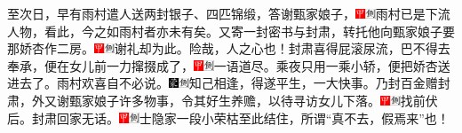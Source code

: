 {至次日，早有雨村遣人送两封银子、四匹锦缎，答谢甄家娘子，{\includegraphics[width=3mm]{../Images/00002}\includegraphics[width=3mm]{../Images/00011}\footnotesize \kaishu 雨村已是下流人物，看此，今之如雨村者亦未有矣。}又寄一封密书与封肃，转托他向甄家娘子要那娇杏作二房。{\includegraphics[width=3mm]{../Images/00002}\includegraphics[width=3mm]{../Images/00011}\footnotesize \kaishu 谢礼却为此。险哉，人之心也！}封肃喜得屁滚尿流，巴不得去奉承，便在女儿前一力撺掇成了，{\includegraphics[width=3mm]{../Images/00002}\includegraphics[width=3mm]{../Images/00011}\footnotesize \kaishu 一语道尽。}乘夜只用一乘小轿，便把娇杏送进去了。雨村欢喜自不必说。{\includegraphics[width=3mm]{../Images/00006}\includegraphics[width=3mm]{../Images/00011}\footnotesize \kaishu 知己相逢，得遂平生，一大快事。}乃封百金赠封肃，外又谢甄家娘子许多物事，令其好生养赡，以待寻访女儿下落。{\includegraphics[width=3mm]{../Images/00002}\includegraphics[width=3mm]{../Images/00011}\footnotesize \kaishu 找前伏后。}封肃回家无话。{\includegraphics[width=3mm]{../Images/00002}\includegraphics[width=3mm]{../Images/00011}\footnotesize \kaishu 士隐家一段小荣枯至此结住，所谓``真不去，假焉来''也！}

}
